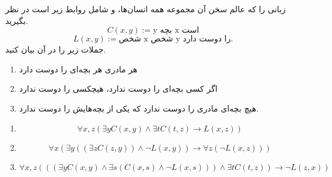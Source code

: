 
	
زبانی را که عالم سخن آن مجموعه همه انسان‌ها، و شامل روابط زیر است در نظر بگیرید.
	$$
		C(x, y) := \text{y بچه x است}
	$$
	$$
		L(x, y) := \text{شخص x شخص y را دوست دارد.}
	$$
	جملات زیر را در آن بیان کنید.
	\begin{enumerate}
		\item هر مادری هر بچه‌ای را دوست دارد
		\item اگر کسی بچه‌ای را دوست ندارد، هیچکسی را دوست ندارد
		\item هیچ بچه‌ای مادری را دوست ندارد که یکی از بچه‌هایش را دوست ندارد.
	\end{enumerate}
	
	\quad\vspace {0.5cm}
	\begin{ans}
		\begin{enumerate}
			\item 
			$$
				\forall x, z(\exists y C(x,y) \wedge \exists t C(t, z) \to L(x, z)) 
			$$
			\item
			$$
				\forall x(\exists y ((\exists z C(z, y)) \wedge \neg L(x, y)) \to \forall z(\neg L(x, z)))
			$$
			\item 
			$$
				\forall x, z(((\exists y C(x, y) \wedge \exists s(C(x, s) \wedge \neg L(x, s))) \wedge \exists t C(t, z)) \to \neg L(z, x))
			$$
			
		\end{enumerate}
	\end{ans}
